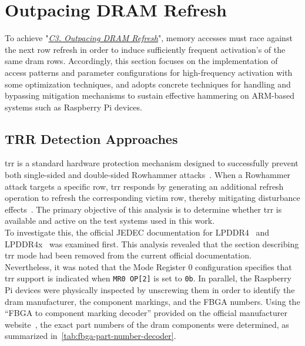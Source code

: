 \section{Outpacing DRAM Refresh} \label{sec:fast}
    To achieve "\textit{\hyperref[ch:fast]{C3. Outpacing DRAM Refresh}}", memory accesses must race against the next 
    row refresh in order to induce 
    sufficiently frequent activation's of the same \gls{dram} rows. Accordingly, this section focuses on 
    the implementation of access patterns and parameter configurations for high-frequency activation 
    with some optimization techniques, and adopts concrete techniques for handling and bypassing 
    mitigation mechanisms to sustain effective hammering on ARM-based systems such as Raspberry Pi 
    devices.

    \subsection{TRR Detection Approaches} \label{subsec:trr-detection-approaches}
        \gls{trr} is a standard hardware protection mechanism designed to successfully 
        prevent both single-sided and double-sided Rowhammer attacks~\cite{paperTRRScope, paperTRRespass}. When a Rowhammer attack 
        targets a specific row, \gls{trr} responds by generating an additional refresh operation to refresh 
        the corresponding victim row, thereby mitigating disturbance effects~\cite{webTenYearsOfRH}. The primary objective 
        of this analysis is to determine whether \gls{trr} is available and active on the test systems used in 
        this work.
        \\
        To investigate this, the official JEDEC documentation for LPDDR4~\cite{docJEDECLPDDR4} and LPDDR4x~\cite{docJEDECLPDDR4x} was 
        examined first. This analysis revealed that the section describing \gls{trr} mode had been removed 
        from the current official documentation. Nevertheless, it was noted that the Mode Register 0 
        configuration specifies that \gls{trr} support is indicated when \texttt{MR0 OP[2]} is set to \texttt{0b}. In 
        parallel, the Raspberry Pi devices were physically inspected by unscrewing them in order to 
        identify the \gls{dram} manufacturer, the component markings, and the FBGA numbers. Using the “FBGA 
        to component marking decoder” provided on the official manufacturer website~\cite{webFBGADecoder}, the exact 
        part numbers of the \gls{dram} components were determined, as summarized in~\cref{tab:fbga-part-number-decoder}.
        
